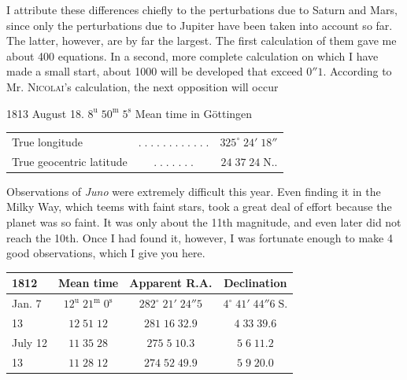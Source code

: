\par\indent I attribute these differences chiefly to the perturbations due to Saturn and Mars, since only the perturbations due to Jupiter have been taken into account so far. The latter, however, are by far the largest. The first calculation of them gave me about 400 equations. In a second, more complete calculation on which I have made a small start, about 1000 will be developed that exceed $0''1$. According to Mr. \textsc{Nicolai}’s calculation, the next opposition will occur

1813 August 18. $8^{\mathrm u}\;50^{\mathrm m}\;5^{\mathrm s}$ Mean time in Göttingen

\begin{center}\fontsize{10}{12}\selectfont\setlength{\tabcolsep}{2pt}\renewcommand{\arraystretch}{1.15}\begin{tabular}{lcr}
True longitude & $.\;.\;.\;.\;.\;.\;.\;.\;.\;.\;.\;.$ & $325^\circ\;24'\;18''$\\
True geocentric latitude & $.\;.\;.\;.\;.\;.\;.$ & $24\;37\;24\;\mathrm{N}..$\\
\end{tabular}\end{center}

\par\indent Observations of \emph{Juno} were extremely difficult this year. Even finding it in the Milky Way, which teems with faint stars, took a great deal of effort because the planet was so faint. It was only about the 11th magnitude, and even later did not reach the 10th. Once I had found it, however, I was fortunate enough to make 4 good observations, which I give you here.

\begin{center}\fontsize{10}{12}\selectfont\setlength{\tabcolsep}{4pt}\renewcommand{\arraystretch}{1.15}\begin{tabular}{l|c|c|c}
1812 & Mean time & Apparent R.A. & Declination\\\hline
Jan. 7 & $12^{\mathrm u}\;21^{\mathrm m}\;0^{\mathrm s}$ & $282^\circ\;21'\;24''5$ & $4^\circ\;41'\;44''6\;\mathrm S.$\\
13 & $12\;51\;12$ & $281\;16\;32.9$ & $4\;33\;39.6$\\
July 12 & $11\;35\;28$ & $275\;5\;10.3$ & $5\;6\;11.2$\\
13 & $11\;28\;12$ & $274\;52\;49.9$ & $5\;9\;20.0$\\
\end{tabular}\end{center}

